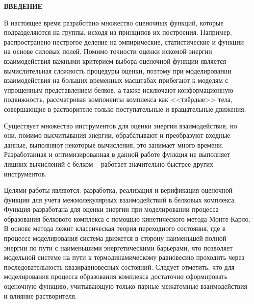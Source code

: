 \newpage
\begin{center}
  \textbf{\large ВВЕДЕНИЕ}
\end{center}

В настоящее время разработано множество оценочных функций, которые подразделяются на группы, исходя из принципов их построения. Например, распространено нестрогое деление на эмпирические, статистические и функции на основе силовых полей. Помимо точности оценки искомой энергии взаимодействия важными критерием выбора оценочной функции является вычислительная сложность процедуры оценки, поэтому при моделировании взаимодействия на больших временных масштабах прибегают к моделям с упрощенным представлением белков, а также исключают конформационную подвижность, рассматривая компоненты комплекса как <<твёрдые>> тела, совершающие в растворителе только поступательные и вращательные движения.

Существует множество инструментов для оценки энергии взаимодействия, но они, помимо высчитывания энергии, обрабатывают и преобразуют входные данные, выполняют некоторые вычисления, это занимает много времени. Разработанная и оптимизированная в данной работе функция не выполняет лишних вычислений с белком -- работает значительно быстрее других инструментов.

Целями работы являются: разработка, реализация и верификация оценочной функции для учета межмолекулярных взаимодействий в белковых комплекса.
Функция разработана для оценки энергии при моделировании процесса образования белкового комплекса с помощью кинетического метода Монте-Карло. В основе метода лежит классическая теория переходного состояния, где в процессе моделирования система движется в сторону наименьшей полной энергии по пути с наименьшими энергетическими барьерами, что позволяет модельной системе на пути к термодинамическому равновесию проходить через последовательность квазиравновесных состояний. Следует отметить, что для моделирования процесса образования комплекса достаточно сформировать оценочную функцию, учитывающую только парные межатомные взаимодействия и влияние растворителя. 
